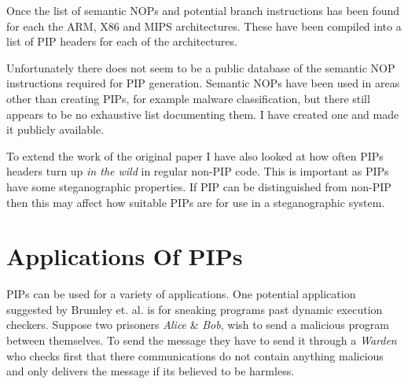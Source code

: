 \documentclass[10pt]{book}
\begin{document}
Once the list of semantic NOPs and potential branch
instructions has been found for each the ARM, X86 and MIPS
architectures. These have been compiled into a list of PIP headers for
each of the architectures.

Unfortunately there does not seem to be a public database of the
semantic NOP instructions required for PIP generation. Semantic NOPs
have been used in areas other than creating PIPs, for example malware
classification\autocite{Bilar:2007uu}\autocite{Preda:2007ky}, but there
still appears to be no exhaustive list documenting them. I have created
one and made it publicly available.

To extend the work of the original paper\autocite{Cha:2010uh} I have
also looked at how often PIPs headers turn up \emph{in the wild} in
regular non-PIP code. This is important as PIPs have some steganographic
properties. If PIP can be distinguished from non-PIP then this may
affect how suitable PIPs are for use in a steganographic system.

\section{Applications Of PIPs}

PIPs can be used for a variety of applications. One potential
application suggested by Brumley et. al.\autocite{Cha:2010uh} is for
sneaking programs past dynamic execution checkers. Suppose two prisoners
\emph{Alice} \& \emph{Bob}, wish to send a malicious program between
themselves. To send the message they have to send it through a
\emph{Warden} who checks first that there communications do not contain
anything malicious and only delivers the message if its believed to be
harmless.
\end{document}
